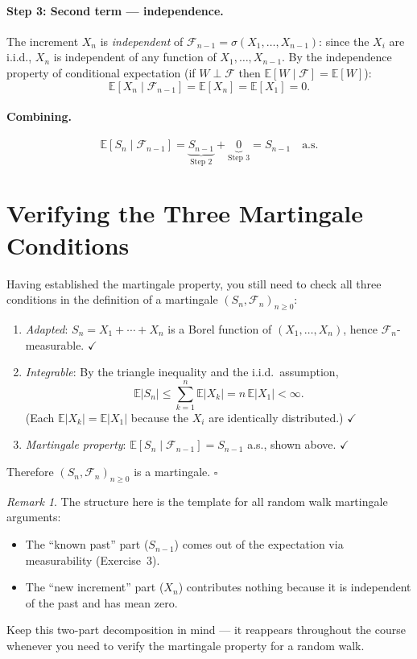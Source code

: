 \documentclass[12pt]{article}
\theoremstyle{remark}
\newtheorem*{remark}{Remark}
\newcommand{\E}{\mathbb{E}}
\newcommand{\F}{\mathcal{F}}
\begin{document}
\paragraph{Step 3: Second term --- independence.}
The increment $X_n$ is \emph{independent} of $\F_{n-1} = \sigma(X_1,\ldots,X_{n-1})$:
since the $X_i$ are i.i.d., $X_n$ is independent of any function of
$X_1, \ldots, X_{n-1}$.  By the independence property of conditional expectation
(if $W \perp \F$ then $\E[W \mid \F] = \E[W]$):
\[
  \E[X_n \mid \F_{n-1}] = \E[X_n] = \E[X_1] = 0.
\]

\paragraph{Combining.}
\[
  \E[S_n \mid \F_{n-1}]
  = \underbrace{S_{n-1}}_{\text{Step 2}} + \underbrace{0}_{\text{Step 3}}
  = S_{n-1} \quad \text{a.s.}
\]

\section*{Verifying the Three Martingale Conditions}

Having established the martingale property, you still need to check all three
conditions in the definition of a martingale
$(S_n, \F_n)_{n \ge 0}$:

\begin{enumerate}
  \item \textit{Adapted}: $S_n = X_1 + \cdots + X_n$ is a Borel function of
        $(X_1, \ldots, X_n)$, hence $\F_n$-measurable. $\checkmark$

  \item \textit{Integrable}: By the triangle inequality and the i.i.d.\ assumption,
        \[
          \E|S_n| \le \sum_{k=1}^n \E|X_k| = n\,\E|X_1| < \infty.
        \]
        (Each $\E|X_k| = \E|X_1|$ because the $X_i$ are identically distributed.) $\checkmark$

  \item \textit{Martingale property}: $\E[S_n \mid \F_{n-1}] = S_{n-1}$ a.s.,
        shown above. $\checkmark$
\end{enumerate}

Therefore $(S_n, \F_n)_{n \ge 0}$ is a martingale. \hfill$\square$

\begin{remark}
  The structure here is the template for all random walk martingale arguments:
  \begin{itemize}
    \item The ``known past'' part ($S_{n-1}$) comes out of the expectation via
          measurability (Exercise~3).
    \item The ``new increment'' part ($X_n$) contributes nothing because it is
          independent of the past and has mean zero.
  \end{itemize}
  Keep this two-part decomposition in mind --- it reappears throughout the
  course whenever you need to verify the martingale property for a random walk.
\end{remark}
\end{document}
